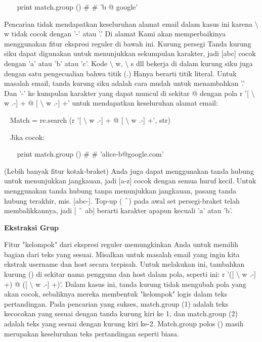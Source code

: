 \begin {enumerate}
\begin {enumerate}
\noindent
~~~ print match.group ()  $  \#  $ $  \#  $ 'b @ google' \par
\vspace{12pt}
Pencarian tidak mendapatkan keseluruhan alamat email dalam kasus ini karena  $  \setminus  $ w tidak cocok dengan '-' atau '.' Di alamat Kami akan memperbaikinya menggunakan fitur ekspresi reguler di bawah ini. Kurung persegi Tanda kurung siku dapat digunakan untuk menunjukkan sekumpulan karakter, jadi [abc] cocok dengan 'a' atau 'b' atau 'c'. Kode  $  \setminus  $ w,  $  \setminus  $ s dll bekerja di dalam kurung siku juga dengan satu pengecualian bahwa titik (.) Hanya berarti titik literal. Untuk masalah email, tanda kurung siku adalah cara mudah untuk menambahkan '.' Dan '-' ke kumpulan karakter yang dapat muncul di sekitar @ dengan pola r '[ $  \setminus  $ w .-] + @ [ $  \setminus  $ w .-] +' untuk mendapatkan keseluruhan alamat email: \par
\vspace{12pt}
\noindent
~ Match = re.search (r '[ $  \setminus  $ w .-] + @ [ $  \setminus  $ w .-] +', str) \par
\noindent
~ Jika cocok: \par
\noindent
~~~ print match.group ()  $  \#  $ $  \#  $ 'alice-b@google.com' \par
\vspace{12pt}
(Lebih banyak fitur kotak-braket) Anda juga dapat menggunakan tanda hubung untuk menunjukkan jangkauan, jadi [a-z] cocok dengan semua huruf kecil. Untuk menggunakan tanda hubung tanpa menunjukkan jangkauan, pasang tanda hubung terakhir, mis. [abc-]. Top-up ( $  \string^  $) pada awal set persegi-braket telah membalikkannya, jadi [ $  \string^  $ ab] berarti karakter apapun kecuali 'a' atau 'b'. \par
\vspace{16pt}
{\fontsize{14pt}{14pt}\selectfont \textbf{Ekstraksi Grup} \\} \par
Fitur "kelompok" dari ekspresi reguler memungkinkan Anda untuk memilih bagian dari teks yang sesuai. Misalkan untuk masalah email yang ingin kita ekstrak username dan host secara terpisah. Untuk melakukan ini, tambahkan kurung () di sekitar nama pengguna dan host dalam pola, seperti ini: r '([ $  \setminus  $ w .-] +) @ ([ $  \setminus  $ w .-] +)'. Dalam kasus ini, tanda kurung tidak mengubah pola yang akan cocok, sebaliknya mereka membentuk "kelompok" logis dalam teks pertandingan. Pada pencarian yang sukses, match.group (1) adalah teks kecocokan yang sesuai dengan tanda kurung kiri ke 1, dan match.group (2) adalah teks yang sesuai dengan kurung kiri ke-2. Match.group polos () masih merupakan keseluruhan teks pertandingan seperti biasa. \par

\end{enumerate}
\end{enumerate}
